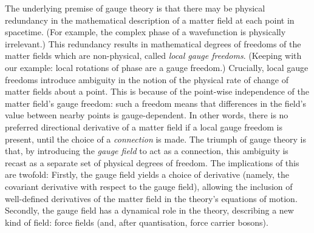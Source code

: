 The underlying premise of gauge theory is that there may be physical redundancy in the mathematical description of a matter field at each point in spacetime.
(For example, the complex phase of a wavefunction is physically irrelevant.)
This redundancy results in mathematical degrees of freedoms of the matter fields which are non-physical, called \emph{local gauge freedoms}.
(Keeping with our example: local rotations of phase are a gauge freedom.)
Crucially, local gauge freedoms introduce ambiguity in the notion of the physical rate of change of matter fields about a point.
This is because of the point-wise independence of the matter field's gauge freedom: such a freedom means that differences in the field's value between nearby points is gauge-dependent.
In other words, there is no preferred directional derivative of a matter field if a local gauge freedom is present, until the choice of a \emph{connection} is made.
The triumph of gauge theory is that, by introducing the \emph{gauge field} to act as a connection, this ambiguity is recast as a separate set of physical degrees of freedom.
The implications of this are twofold:
Firstly, the gauge field yields a choice of derivative (namely, the covariant derivative with respect to the gauge field), allowing the inclusion of well-defined derivatives of the matter field in the theory's equations of motion.
Secondly, the gauge field has a dynamical role in the theory, describing a new kind of field: force fields (and, after quantisation, force carrier bosons).



